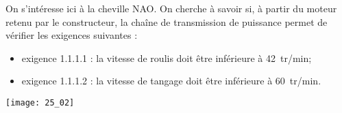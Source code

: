 \normaltrue \difficilefalse \tdifficilefalse
\correctiontrue


\setcounter{question}{0}%
\ifcorrection
\else
{}
\fi

\ifprof
\else
On s'intéresse ici à la cheville NAO. On cherche à savoir si, à partir du moteur retenu par le constructeur, la chaîne de transmission de puissance permet de vérifier les exigences suivantes : 
\begin{itemize}
\item exigence 1.1.1.1 : la vitesse de roulis doit être inférieure à \SI{42}{tr/min};
\item exigence 1.1.1.2 : la vitesse de tangage doit être inférieure à \SI{60}{tr/min}.
\end{itemize}


\begin{marginfigure}
\texttt{[image: 25\_02]}
\end{marginfigure}

